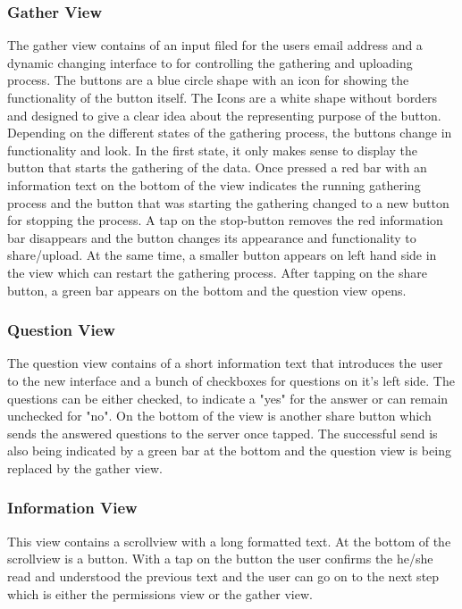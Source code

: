 \subsubsection{Gather View}
The gather view contains of an input filed for the users email address and a dynamic changing interface to for controlling the gathering and uploading process. The buttons are a blue circle shape with an icon for showing the functionality of the button itself. The Icons are a white shape without borders and designed to give a clear idea about the representing purpose of the button. 
Depending on the different states of the gathering process, the buttons change in functionality and look. In the first state, it only makes sense to display the button that starts the gathering of the data. Once pressed a red bar with an information text on the bottom of the view indicates the running gathering process and the button that was starting the gathering changed to a new button for stopping the process. 
A tap on the stop-button removes the red information bar disappears and the button changes its appearance and functionality to share/upload. 
At the same time, a smaller button appears on left hand side in the view which can restart the gathering process. 
After tapping on the share button, a green bar appears on the bottom and the question view opens. 

\subsubsection{Question View}
The question view contains of a short information text that introduces the user to the new interface and a bunch of checkboxes for questions on it's left side. 
The questions can be either checked, to indicate a "yes" for the answer or can remain unchecked for "no".
On the bottom of the view is another share button which sends the answered questions to the server once tapped. 
The successful send is also being indicated by a green bar at the bottom and the question view is being replaced by the gather view. 

\subsubsection{Information View}
This view contains a scrollview with a long formatted text. At the bottom of the scrollview is a button. With a tap on the button the user confirms the he/she read and understood the previous text and the user can go on to the next step which is either the permissions view or the gather view. 

